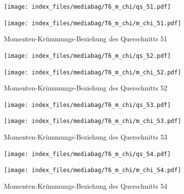 \documentclass[
  11pt,
  letterpaper,
]{scrreprt}
\begin{document}
\begin{figure}[H]

\begin{minipage}{0.50\linewidth}
\texttt{[image: index\_files/mediabag/T6\_m\_chi/qs\_51.pdf]}\end{minipage}%
%
\begin{minipage}{0.50\linewidth}
\texttt{[image: index\_files/mediabag/T6\_m\_chi/m\_chi\_51.pdf]}\end{minipage}%

\caption{\label{fig-mchi_anhang}Momenten-Krümmungs-Beziehung des
Querschnitts 51}

\end{figure}%

\begin{figure}[H]

\begin{minipage}{0.50\linewidth}
\texttt{[image: index\_files/mediabag/T6\_m\_chi/qs\_52.pdf]}\end{minipage}%
%
\begin{minipage}{0.50\linewidth}
\texttt{[image: index\_files/mediabag/T6\_m\_chi/m\_chi\_52.pdf]}\end{minipage}%

\caption{\label{fig-mchi_anhang}Momenten-Krümmungs-Beziehung des
Querschnitts 52}

\end{figure}%

\begin{figure}[H]

\begin{minipage}{0.50\linewidth}
\texttt{[image: index\_files/mediabag/T6\_m\_chi/qs\_53.pdf]}\end{minipage}%
%
\begin{minipage}{0.50\linewidth}
\texttt{[image: index\_files/mediabag/T6\_m\_chi/m\_chi\_53.pdf]}\end{minipage}%

\caption{\label{fig-mchi_anhang}Momenten-Krümmungs-Beziehung des
Querschnitts 53}

\end{figure}%

\begin{figure}[H]

\begin{minipage}{0.50\linewidth}
\texttt{[image: index\_files/mediabag/T6\_m\_chi/qs\_54.pdf]}\end{minipage}%
%
\begin{minipage}{0.50\linewidth}
\texttt{[image: index\_files/mediabag/T6\_m\_chi/m\_chi\_54.pdf]}\end{minipage}%

\caption{\label{fig-mchi_anhang}Momenten-Krümmungs-Beziehung des
Querschnitts 54}

\end{figure}%
\end{document}
